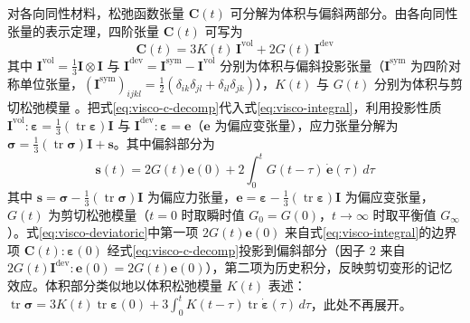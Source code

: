 对各向同性材料，松弛函数张量 $\mathbf{C}(t)$ 可分解为体积与偏斜两部分。由各向同性张量的表示定理，四阶张量 $\mathbf{C}(t)$ 可写为
\begin{equation}
  \mathbf{C}(t)=3K(t)\,\mathbf{I}^{\mathrm{vol}}+2G(t)\,\mathbf{I}^{\mathrm{dev}}
  \label{eq:visco-c-decomp}
\end{equation}
其中 $\mathbf{I}^{\mathrm{vol}}=\tfrac{1}{3}\mathbf{I}\otimes\mathbf{I}$ 与 $\mathbf{I}^{\mathrm{dev}}=\mathbf{I}^{\mathrm{sym}}-\mathbf{I}^{\mathrm{vol}}$ 分别为体积与偏斜投影张量（$\mathbf{I}^{\mathrm{sym}}$ 为四阶对称单位张量，$(\mathbf{I}^{\mathrm{sym}})_{ijkl}=\tfrac{1}{2}(\delta_{ik}\delta_{jl}+\delta_{il}\delta_{jk})$），$K(t)$ 与 $G(t)$ 分别为体积与剪切松弛模量 \cite{Christensen1982}。把式\eqref{eq:visco-c-decomp}代入式\eqref{eq:visco-integral}，利用投影性质 $\mathbf{I}^{\mathrm{vol}}:\boldsymbol{\varepsilon}=\tfrac{1}{3}(\operatorname{tr}\boldsymbol{\varepsilon})\mathbf{I}$ 与 $\mathbf{I}^{\mathrm{dev}}:\boldsymbol{\varepsilon}=\mathbf{e}$（$\mathbf{e}$ 为偏应变张量），应力张量分解为 $\boldsymbol{\sigma}=\tfrac{1}{3}(\operatorname{tr}\boldsymbol{\sigma})\mathbf{I}+\mathbf{s}$。其中偏斜部分为
\begin{equation}
  \mathbf{s}(t)=2G(t)\mathbf{e}(0)+2\int_{0}^{t}G(t-\tau)\,\dot{\mathbf{e}}(\tau)\,d\tau
  \label{eq:visco-deviatoric}
\end{equation}
其中 $\mathbf{s}=\boldsymbol{\sigma}-\tfrac{1}{3}(\operatorname{tr}\boldsymbol{\sigma})\mathbf{I}$ 为偏应力张量，$\mathbf{e}=\boldsymbol{\varepsilon}-\tfrac{1}{3}(\operatorname{tr}\boldsymbol{\varepsilon})\mathbf{I}$ 为偏应变张量，$G(t)$ 为剪切松弛模量（$t=0$ 时取瞬时值 $G_{0}=G(0)$，$t\to\infty$ 时取平衡值 $G_{\infty}$）\cite{Christensen1982}。式\eqref{eq:visco-deviatoric}中第一项 $2G(t)\mathbf{e}(0)$ 来自式\eqref{eq:visco-integral}的边界项 $\mathbf{C}(t):\boldsymbol{\varepsilon}(0)$ 经式\eqref{eq:visco-c-decomp}投影到偏斜部分（因子 $2$ 来自 $2G(t)\mathbf{I}^{\mathrm{dev}}:\mathbf{e}(0)=2G(t)\mathbf{e}(0)$），第二项为历史积分，反映剪切变形的记忆效应。体积部分类似地以体积松弛模量 $K(t)$ 表述：$\operatorname{tr}\boldsymbol{\sigma}=3K(t)\operatorname{tr}\boldsymbol{\varepsilon}(0)+3\int_{0}^{t}K(t-\tau)\operatorname{tr}\dot{\boldsymbol{\varepsilon}}(\tau)\,d\tau$，此处不再展开。

